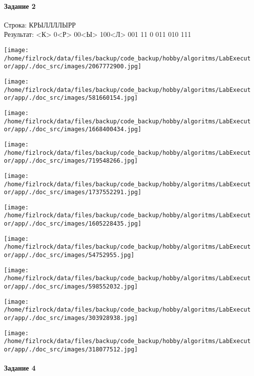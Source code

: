 \documentclass[a4paper, 12pt]{article}
\begin{document}
\paragraph{Задание 2}

Строка: 
КРЫЛЛЛЛЫРР\\
Результат: <К> 0<Р> 00<Ы> 100<Л> 001 11 0 011 010 111

\texttt{[image: /home/fizlrock/data/files/backup/code\_backup/hobby/algoritms/LabExecutor/app/./doc\_src/images/2067772900.jpg]}

\texttt{[image: /home/fizlrock/data/files/backup/code\_backup/hobby/algoritms/LabExecutor/app/./doc\_src/images/581660154.jpg]}

\texttt{[image: /home/fizlrock/data/files/backup/code\_backup/hobby/algoritms/LabExecutor/app/./doc\_src/images/1668400434.jpg]}

\texttt{[image: /home/fizlrock/data/files/backup/code\_backup/hobby/algoritms/LabExecutor/app/./doc\_src/images/719548266.jpg]}

\texttt{[image: /home/fizlrock/data/files/backup/code\_backup/hobby/algoritms/LabExecutor/app/./doc\_src/images/1737552291.jpg]}

\texttt{[image: /home/fizlrock/data/files/backup/code\_backup/hobby/algoritms/LabExecutor/app/./doc\_src/images/1605228435.jpg]}

\texttt{[image: /home/fizlrock/data/files/backup/code\_backup/hobby/algoritms/LabExecutor/app/./doc\_src/images/54752955.jpg]}

\texttt{[image: /home/fizlrock/data/files/backup/code\_backup/hobby/algoritms/LabExecutor/app/./doc\_src/images/598552032.jpg]}

\texttt{[image: /home/fizlrock/data/files/backup/code\_backup/hobby/algoritms/LabExecutor/app/./doc\_src/images/303928938.jpg]}

\texttt{[image: /home/fizlrock/data/files/backup/code\_backup/hobby/algoritms/LabExecutor/app/./doc\_src/images/318077512.jpg]}
\pagebreak
\paragraph{Задание 4}
\end{document}
